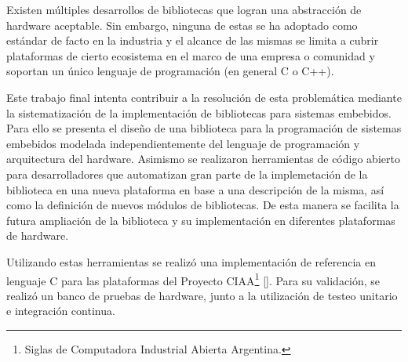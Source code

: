 Existen múltiples desarrollos de bibliotecas que logran una abstracción de hardware aceptable. Sin embargo, ninguna de estas se ha adoptado como estándar de facto en la industria y el alcance de las mismas se limita a cubrir plataformas de cierto ecosistema en el marco de una empresa o comunidad y soportan un único lenguaje de programación (en general C o C++).

Este trabajo final intenta contribuir a la resolución de esta problemática mediante la sistematización de la implementación de bibliotecas para sistemas embebidos. Para ello se presenta el diseño de una biblioteca para la programación de sistemas embebidos modelada independientemente del lenguaje de programación y arquitectura del hardware. Asimismo se realizaron herramientas de código abierto para desarrolladores que automatizan gran parte de la implemetación de la biblioteca en una nueva plataforma en base a una descripción de la misma, así como la definición de nuevos módulos de bibliotecas. De esta manera se facilita la futura ampliación de la biblioteca y su implementación en diferentes plataformas de hardware.		

Utilizando estas herramientas se realizó una implementación de referencia en lenguaje C para las plataformas del Proyecto CIAA\footnote{Siglas de Computadora Industrial Abierta Argentina.} []. Para su validación, se realizó un banco de pruebas de hardware, junto a la utilización de testeo unitario e integración continua.
